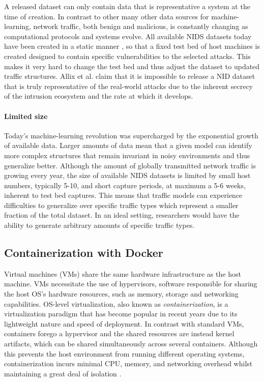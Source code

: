 \documentclass[sigconf]{acmart}
\begin{document}
A released dataset can only contain data that is representative a system at the time of creation. In contrast to other many other data sources for machine-learning, network traffic, both benign and malicious, is constantly changing as computational protocols and systems evolve. All available NIDS datasets today have been created in a static manner , so that a fixed test bed of host machines is created designed to contain specific vulnerabilities to the selected attacks. This makes it very hard to change the test bed and thus adjust the dataset to updated traffic structures. Allix et al. \cite{allix2014machine} claim that it is impossible to release a NID dataset that is truly representative of the real-world attacks due to the inherent secrecy of the intrusion ecosystem and the rate at which it develops.


\paragraph{Limited size}
Today's machine-learning revolution was supercharged by the exponential growth of available data. Larger amounts of data mean that a given model can identify more complex structures that remain invariant in noisy environments and thus generalize better. Although the amount of globally transmitted network traffic is growing every year, the size of available NIDS datasets is limited by small host numbers, typically 5-10, and short capture periods, at maximum a 5-6 weeks, inherent to test bed captures. This means that traffic models can experience difficulties to generalize over specific traffic types which represent a smaller fraction of the total dataset. In an ideal setting, researchers would have the ability to generate arbitrary amounts of specific traffic types.


\subsection{Containerization with Docker}
Virtual machines (VMs) share the same hardware infrastructure as the host machine. VMs necessitate the use of hypervisors, software responsible for sharing the host OS's hardware resources, such as memory, storage and networking capabilities. OS-level virtualization, also known as \textit{containerization}, is a virtualization paradigm that has become popular in recent years due to its lightweight nature and speed of deployment. 
In contrast with standard VMs, containers forego a hypervisor and the shared resources are instead kernel artifacts, which can be shared simultaneously across several containers. Although this prevents the host environment from running different operating systems, containerization incurs minimal CPU, memory, and networking overhead whilst maintaining a great deal of isolation \cite{kolyshkin2006virtualization}. 
 
\end{document}
